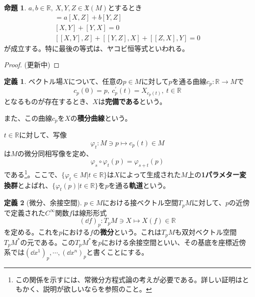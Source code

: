 \documentclass[unicode,a4paper,11pt]{ltjsarticle}
\theoremstyle{definition}
\newtheorem{dfn}{定義}[section]
\newtheorem{prop}{命題}[section]
\begin{document}
\begin{prop}
  $a,b\in \mathbb{R},\ X,Y,Z\in \mathfrak{X}(M)$とするとき
  \begin{gather}
    [aX+bY,Z]
    =
    a[X,Z]
    +
    b[Y,Z]
    \\
    [X,Y]
    +
    [Y,X]
    =
    0
    \\
    [[X,Y],Z]
    +
    [[Y,Z],X]
    +
    [[Z,X],Y]
    =
    0
  \end{gather}
  が成立する。特に最後の等式は、ヤコビ恒等式といわれる。
\end{prop}

\begin{proof}
  \label{prf:prop_1_1}
  (更新中)
\end{proof}

\begin{dfn}
  ベクトル場$X$について、任意の$p\in M$に対して$p$を通る曲線$c_{p}:\mathbb{R}\rightarrow M$で
  \begin{equation}
    c_{p}(0)
    =
    p
    ,\
    c^{\prime}_{p}(t)
    =
    X_{c_{p}(t)}
    ,\
    t\in\mathbb{R}
  \end{equation}
  となるものが存在するとき、$X$は\textbf{完備である}という。

  また、この曲線$c_{p}$を$X$の\textbf{積分曲線}という。

  $t\in\mathbb{R}$に対して、写像
  \begin{equation}
    \varphi_{t}:M\ni p\mapsto c_{p}(t)\in M
  \end{equation}
  は$M$の微分同相写像を定め、
  \begin{equation}
    \varphi_{s}\circ\varphi_{t}(p)
    =
    \varphi_{s+t}(p)
    \label{eqn:one_parameter_grp}
  \end{equation}
  である\footnote{
    この関係を示すには、常微分方程式論の考えが必要である。詳しい証明はともかく、説明が欲しいなら\cite{Nakahara:2003}を参照のこと。
  }。ここで、$\{\varphi_{t}\in M|t\in \mathbb{R}\}$は$X$によって生成された$M$上の\textbf{1パラメター変換群}とよばれ、$\{\varphi_{t}(p)|t\in\mathbb{R}\}$を$p$を通る\textbf{軌道}という。
\end{dfn}

\begin{dfn}[微分、余接空間]
  $p\in M$における接ベクトル空間$T_{p}M$に対して、$p$の近傍で定義された$C^{\infty}$関数$f$は線形形式
  \begin{equation}
    (\dd f)_{p}
    :
    T_{p}M\ni X\mapsto X(f)\in\mathbb{R}
  \end{equation}
  を定める。これを$p$における$f$の\textbf{微分}という。これは$T_{p}M$も双対ベクトル空間$T_{p}M^{\ast}$の元である。この$T_{p}M^{\ast}$を$p$における余接空間といい、その基底を座標近傍系では$(\dd x^{1})_{p},\cdots,(\dd x^{n})_{p}$と書くことにする。  
\end{dfn}
\end{document}

